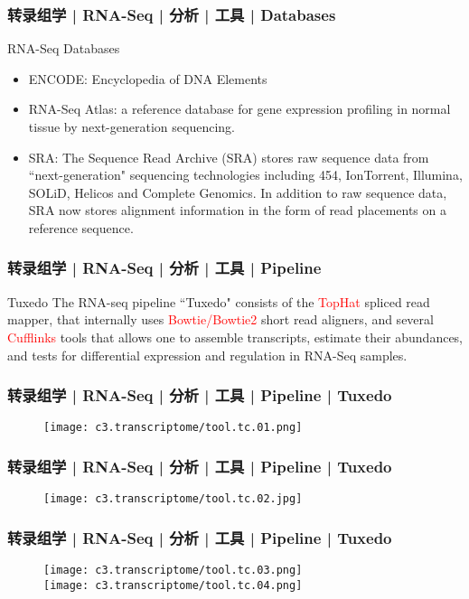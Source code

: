 \begin{frame}
  \frametitle{转录组学 | RNA-Seq | 分析 | 工具 | Databases}
  \begin{block}{RNA-Seq Databases}
    \begin{itemize}
      \item ENCODE: Encyclopedia of DNA Elements
      \item RNA-Seq Atlas: a reference database for gene expression profiling in normal tissue by next-generation sequencing.
      \item SRA: The Sequence Read Archive (SRA) stores raw sequence data from ``next-generation" sequencing technologies including 454, IonTorrent, Illumina, SOLiD, Helicos and Complete Genomics. In addition to raw sequence data, SRA now stores alignment information in the form of read placements on a reference sequence.
    \end{itemize}
  \end{block}
\end{frame}

\begin{frame}
  \frametitle{转录组学 | RNA-Seq | 分析 | 工具 | Pipeline}
  \begin{block}{Tuxedo}
    The RNA-seq pipeline ``Tuxedo" consists of the \textcolor{red}{TopHat} spliced read mapper, that internally uses \textcolor{red}{Bowtie/Bowtie2} short read aligners, and several \textcolor{red}{Cufflinks} tools that allows one to assemble transcripts, estimate their abundances, and tests for differential expression and regulation in RNA-Seq samples.
  \end{block}
\end{frame}

\begin{frame}
  \frametitle{转录组学 | RNA-Seq | 分析 | 工具 | Pipeline | Tuxedo}
  \begin{figure}
    \centering
    \texttt{[image: c3.transcriptome/tool.tc.01.png]}
  \end{figure}
\end{frame}

\begin{frame}
  \frametitle{转录组学 | RNA-Seq | 分析 | 工具 | Pipeline | Tuxedo}
  \begin{figure}
    \centering
    \texttt{[image: c3.transcriptome/tool.tc.02.jpg]}
  \end{figure}
\end{frame}

\begin{frame}
  \frametitle{转录组学 | RNA-Seq | 分析 | 工具 | Pipeline | Tuxedo}
  \begin{figure}
    \centering
    \texttt{[image: c3.transcriptome/tool.tc.03.png]}\\
    \vspace{0.5em}
    \texttt{[image: c3.transcriptome/tool.tc.04.png]}
  \end{figure}
\end{frame}

